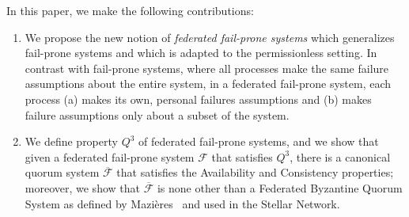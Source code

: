 \documentclass[11pt]{article}
\begin{document}
In this paper, we make the following contributions:
\begin{enumerate}
  \item
    We propose the new notion of \emph{federated fail-prone systems} which generalizes fail-prone systems and which is adapted to the permissionless setting.
    In contrast with fail-prone systems, where all processes make the same failure assumptions about the entire system, in a federated fail-prone system, each process (a) makes its own, personal failures assumptions and (b) makes failure assumptions only about a subset of the system.
  \item
    We define property $Q^3$ of federated fail-prone systems, and we show that given a federated fail-prone system $\mathcal{F}$ that satisfies $Q^3$, there is a canonical quorum system $\overline{\mathcal{F}}$ that satisfies the Availability and Consistency properties; moreover, we show that $\overline{\mathcal{F}}$ is none other than a Federated Byzantine Quorum System as defined by Mazières~\cite{MazieresStellarConsensusProtocol2015} and used in the Stellar Network.
\end{enumerate}





\end{document}
